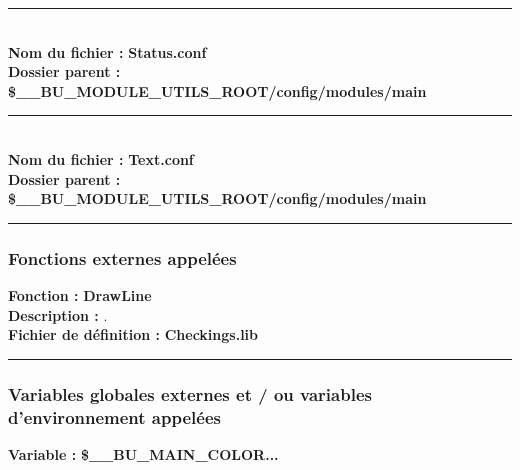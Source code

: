 \documentclass[a4paper,10pt]{article}
\begin{document}
\color{lime}\par\noindent\rule{\textwidth}{0.4pt}\color{white}\\[1\baselineskip]

\textbf{Nom du fichier :} \textbf{\color{lime}Status.conf\color{white}}\\[1\baselineskip]
\textbf{Dossier parent :} \textbf{\color{orange}\$\_\_BU\_MODULE\_UTILS\_ROOT\color{lime}/config/modules/main\color{white}}\\[1\baselineskip]



\color{lime}\par\noindent\rule{\textwidth}{0.4pt}\color{white}\\[1\baselineskip]

\textbf{Nom du fichier :} \textbf{\color{lime}Text.conf\color{white}}\\[1\baselineskip]
\textbf{Dossier parent :} \textbf{\color{orange}\$\_\_BU\_MODULE\_UTILS\_ROOT\color{lime}/config/modules/main\color{white}}\\[1\baselineskip]




\color{blue}\par\noindent\rule{\textwidth}{0.4pt}\color{white}

\color{blue}
\subsubsection{Fonctions externes appelées}\color{white}
\textbf{Fonction :} \textbf{\color{mauve}DrawLine\color{white}}\\[1\baselineskip]

\textbf{Description :} .\\[1\baselineskip]

\textbf{Fichier de définition :} \textbf{\color{lime}Checkings.lib\color{white}}\\[1\baselineskip]



\color{blue}\par\noindent\rule{\textwidth}{0.4pt}\color{white}

\color{blue}
\subsubsection{Variables globales externes et / ou variables d'environnement appelées}\color{white}
\textbf{Variable :} \textbf{\color{orange}\$\_\_BU\_MAIN\_COLOR...\color{white}}\\[1\baselineskip]
\end{document}
